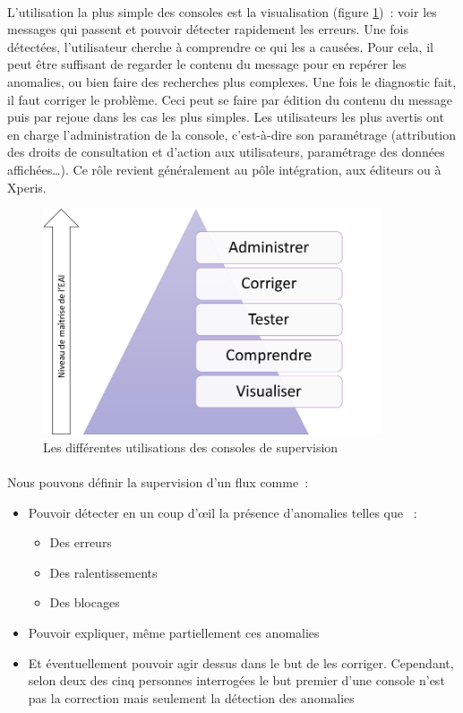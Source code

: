 			\paragraph{}
			L’utilisation la plus simple des consoles est la visualisation (figure
			\ref{usage_consoles})~: voir les messages qui passent et pouvoir détecter
			rapidement les erreurs. Une fois détectées, l’utilisateur cherche à
			comprendre ce qui les a causées. Pour cela, il peut être suffisant de
			regarder le contenu du message pour en repérer les anomalies, ou bien faire
			des recherches plus complexes.
			Une fois le diagnostic fait, il faut corriger le problème. Ceci peut se
			faire par édition du contenu du message puis par rejoue dans les cas les
			plus simples.\newline
			Les utilisateurs les plus
			avertis ont en charge l’administration de la console, c’est-à-dire son
			paramétrage (attribution des droits de consultation et d’action aux
			utilisateurs, paramétrage des données affichées\ldots). Ce rôle revient
			généralement au pôle intégration, aux éditeurs ou à Xperis.
			\begin{figure}[H]
				\centering
				\includegraphics[width=10cm]{../img/usage_1.png}
				\caption{\label{usage_consoles} Les différentes utilisations des consoles
				de supervision}
			\end{figure}
			
			\paragraph{}
			Nous pouvons définir la supervision d'un flux comme~:
			\begin{itemize}
			  \item Pouvoir détecter en un coup d’œil la présence d’anomalies telles que
			 ~:
			  	\begin{itemize}
			  	  \item Des erreurs
			  	  \item Des ralentissements
			  	  \item Des blocages
		  	    \end{itemize}
			  \item Pouvoir expliquer, même partiellement ces anomalies
			  \item Et éventuellement pouvoir agir dessus dans le but de les corriger.
			  Cependant, selon deux des cinq personnes interrogées le but premier d'une
			  console n'est pas la correction mais seulement la détection des anomalies
			\end{itemize}
			
